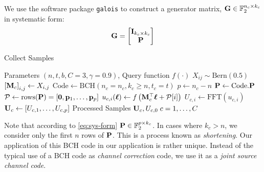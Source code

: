 We use the software package \verb|galois| \cite{Hostetter_Galois_2020} to construct a generator matrix, $\mathbf G \in \mathbb F_2^{n_c \times k_c}$ in systematic form:
\begin{equation} \label{eq:sys-form}
    \mathbf G = 
\begin{bmatrix}
\mathbf I_{k_c \times k_c}\\
\mathbf P
\end{bmatrix}
\end{equation}
\begin{algorithm}
   \caption{Collect Samples}
   \label{alg:collect}
\begin{algorithmic}[1]
    Parameters $(n, t, b, C=3, \gamma=0.9)$, Query function $f(\cdot)$ 
      
     \State $X_{ij} \sim \mathrm{Bern}(0.5)$
     \State $\left[\mathbf M_c\right]_{i,j} \gets X_{i,j}$
   \EndFor
   \State $\mathrm{Code} \gets \mathrm{BCH}(n_c=n_c, k_c\geq n,  t_c=t)$ 
   \State $p \gets n_c - n$
   \State $\mathbf P \gets \mathrm{Code}.\mathbf P$
   \State $\mathcal P \gets \mathrm{rows}(\mathbf P) = \left[ \boldsymbol{0}, \mathbf p_1, \dotsc, \mathbf p_p \right]$
   \State $u_{c,i} (\boldsymbol{\ell}) \gets f\left(\mathbf M_c^\top \boldsymbol{\ell} + \mathcal P[i] \right)$ 
   \EndFor
   \State $U_{c,i} \gets \mathrm{FFT}(u_{c,i})$ 
   \EndFor
   \State $\mathbf U_c \gets \left[ U_{c,1}, \dotsc, U_{c, p}\right]$ 
     Processed Samples  $\mathbf U_c,U_{c,0}\; c=1, \dotsc, C$
\end{algorithmic}
\end{algorithm}
Note that according to \eqref{eq:sys-form} $\mathbf P \in \mathbb F_2^{ p \times k_c}$. In cases where $k_c > n$, we consider only the first $n$ rows of $\mathbf P$. This is a process known as \emph{shortening}.
Our application of this BCH code in our application is rather unique. Instead of the typical use of a BCH code as \emph{channel correction} code, we use it as a \emph{joint source channel code}. 

